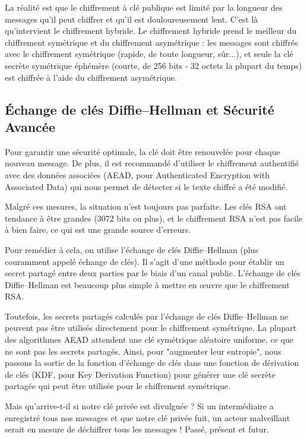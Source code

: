 La réalité est que le chiffrement à clé publique est limité par la longueur des messages qu'il peut chiffrer et qu'il est douloureusement lent. C'est là qu'intervient le chiffrement hybride. Le chiffrement hybride prend le meilleur du chiffrement symétrique et du chiffrement asymétrique : les messages sont chiffrés avec le chiffrement symétrique (rapide, de toute longueur, sûr...), et seule la clé secrète symétrique éphémère (courte, de 256 bits - 32 octets la plupart du temps) est chiffrée à l'aide du chiffrement asymétrique.

\subsection{Échange de clés Diffie–Hellman et Sécurité Avancée}

Pour garantir une sécurité optimale, la clé doit être renouvelée pour chaque nouveau message. De plus, il est recommandé d'utiliser le chiffrement authentifié avec des données associées (AEAD, pour Authenticated Encryption with Associated Data) qui nous permet de détecter si le texte chiffré a été modifié.

Malgré ces mesures, la situation n'est toujours pas parfaite. Les clés RSA ont tendance à être grandes (3072 bits ou plus), et le chiffrement RSA n'est pas facile à bien faire, ce qui est une grande source d'erreurs.

Pour remédier à cela, on utilise l'échange de clés Diffie–Hellman (plus couramment appelé échange de clés). Il s'agit d'une méthode pour établir un secret partagé entre deux parties par le biais d'un canal public. L'échange de clés Diffie–Hellman est beaucoup plus simple à mettre en œuvre que le chiffrement RSA.

Toutefois, les secrets partagés calculés par l'échange de clés Diffie–Hellman ne peuvent pas être utilisés directement pour le chiffrement symétrique. La plupart des algorithmes AEAD attendent une clé symétrique aléatoire uniforme, ce que ne sont pas les secrets partagés. Ainsi, pour "augmenter leur entropie", nous passons la sortie de la fonction d'échange de clés dans une fonction de dérivation de clés (KDF, pour Key Derivation Function) pour générer une clé secrète partagée qui peut être utilisée pour le chiffrement symétrique.

Mais qu'arrive-t-il si notre clé privée est divulguée ? Si un intermédiaire a enregistré tous nos messages et que notre clé privée fuit, un acteur malveillant serait en mesure de déchiffrer tous les messages ! Passé, présent et futur.

